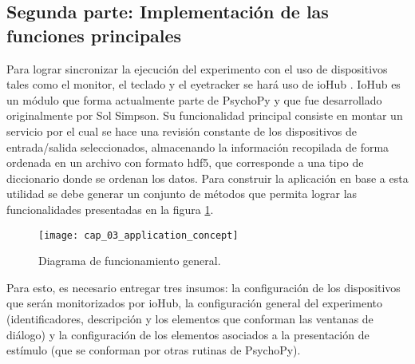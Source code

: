 \documentclass[\main/main.tex]{subfiles}
\begin{document}
	\subsection{Segunda parte: Implementación de las funciones principales}
	\label{sub:03_implementacion_backtend}
		Para lograr sincronizar la ejecución del experimento con el uso de dispositivos tales como el monitor, el teclado y el eyetracker se hará uso de ioHub \cite{website:iohub}. IoHub es un módulo que forma actualmente parte de PsychoPy y que fue desarrollado originalmente por Sol Simpson. Su funcionalidad principal consiste en montar un servicio por el cual se hace una revisión constante de los dispositivos de entrada/salida seleccionados, almacenando la información recopilada de forma ordenada en un archivo con formato hdf5, que corresponde a una tipo de diccionario donde se ordenan los datos. Para construir la aplicación en base a esta utilidad se debe generar un conjunto de métodos que permita lograr las funcionalidades presentadas en la figura \ref{fig:03_application_concept}. 
		\begin{figure}[H]
			\centering
			\texttt{[image: cap\_03\_application\_concept]}
			\caption{Diagrama de funcionamiento general.}
			\label{fig:03_application_concept}
		\end{figure} 

		Para esto, es necesario entregar tres insumos: la configuración de los dispositivos que serán monitorizados por ioHub, la configuración general del experimento (identificadores, descripción y los elementos que conforman las ventanas de diálogo) y la configuración de los elementos asociados a la presentación de estímulo (que se conforman por otras rutinas de PsychoPy).
\end{document}
